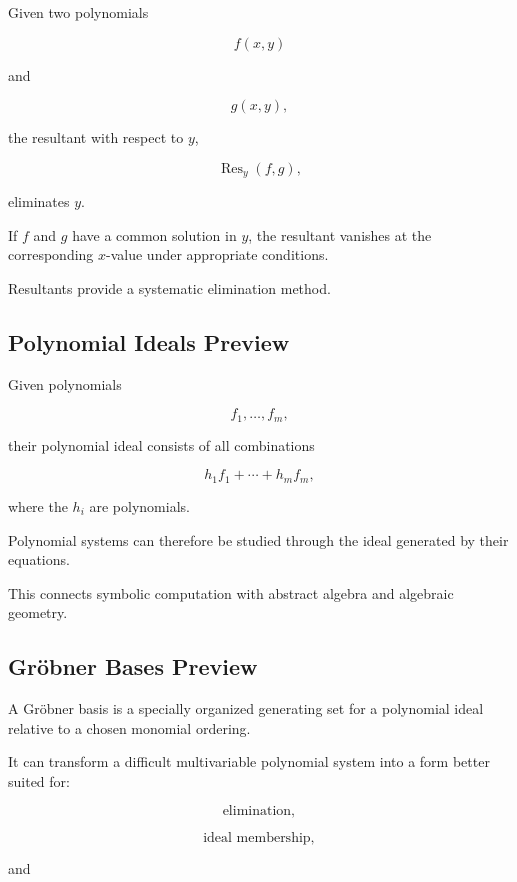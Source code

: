 Given two polynomials

\[
f(x,y)
\]

and

\[
g(x,y),
\]

the resultant with respect to \(y\),

\[
\boxed{
\operatorname{Res}_y(f,g),
}
\]

eliminates \(y\).

If \(f\) and \(g\) have a common solution in \(y\), the resultant vanishes
at the corresponding \(x\)-value under appropriate conditions.

Resultants provide a systematic elimination method.

\subsection{Polynomial Ideals Preview}
\label{subsec:polynomial-ideals-symbolic}

Given polynomials

\[
f_1,\ldots,f_m,
\]

their polynomial ideal consists of all combinations

\[
\boxed{
h_1f_1
+
\cdots
+
h_mf_m,
}
\]

where the \(h_i\) are polynomials.

Polynomial systems can therefore be studied through the ideal generated by
their equations.

This connects symbolic computation with abstract algebra and algebraic
geometry.

\subsection{Gröbner Bases Preview}
\label{subsec:groebner-bases-preview}

A Gröbner basis is a specially organized generating set for a polynomial
ideal relative to a chosen monomial ordering.

It can transform a difficult multivariable polynomial system into a form
better suited for:

\[
\boxed{
\text{elimination},
}
\]

\[
\boxed{
\text{ideal membership},
}
\]

and

